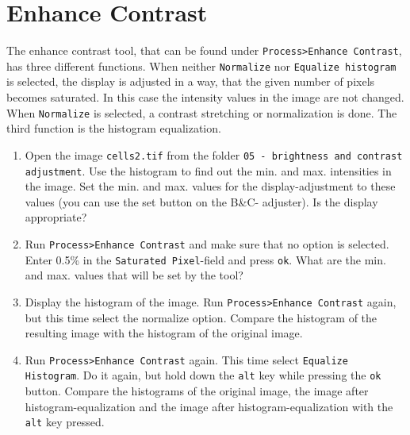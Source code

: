 \section{Enhance Contrast}

The enhance contrast tool, that can be found under \texttt{Process>Enhance Contrast}, has three different functions. When neither \texttt{Normalize} nor \texttt{Equalize histogram} is selected, the display is adjusted in a way, that the given number of pixels becomes saturated. In this case the intensity values in the image are not changed. When \texttt{Normalize} is selected, a contrast stretching or normalization is done. The third function is the histogram equalization.

\begin{enumerate}

\item Open the image \texttt{cells2.tif} from the folder \texttt{05 - brightness and contrast adjustment}. Use the histogram to find out the min. and max. intensities in the image. Set the min. and max. values for the display-adjustment to these values (you can use the set button on the B\&C-
adjuster). Is the display appropriate?

\fbox{
	\begin{minipage}{\linewidth}
		\hfill\vspace{1cm}
	\end{minipage}
	}
	
\item Run \texttt{Process>Enhance Contrast} and make sure that no option is selected. Enter 0.5\% in the
\texttt{Saturated Pixel}-field and press \texttt{ok}. What are the min. and max. values that will be set by the tool?

\fbox{
	\begin{minipage}{\linewidth}
		\hfill\vspace{1cm}
	\end{minipage}
	}

\item Display the histogram of the image. Run \texttt{Process>Enhance Contrast} again, but this time
select the normalize option. Compare the histogram of the resulting image with the histogram of the original image.

\item Run \texttt{Process>Enhance Contrast} again. This time select \texttt{Equalize Histogram}. Do it again, but hold down the \texttt{alt} key while pressing the \texttt{ok} button. Compare the histograms of the original image, the image after histogram-equalization and the image after histogram-equalization with the \texttt{alt} key pressed.


\end{enumerate}
